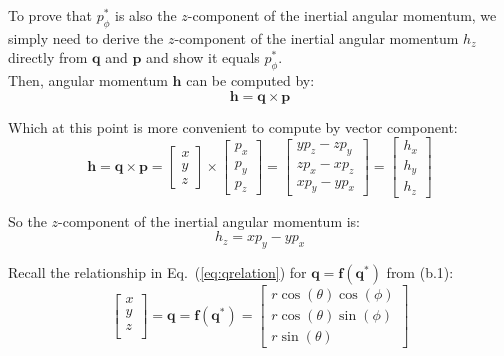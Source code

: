 \documentclass[titlepage]{article}
\begin{document}
To prove that $p_\phi^*$ is also the $z$-component of the inertial angular momentum, we simply need to derive the $z$-component of the inertial angular momentum $h_z$ directly from $\boldsymbol{q}$ and $\boldsymbol{p}$ and show it equals $p_\phi^*$.\\

Then, angular momentum $\boldsymbol{h}$ can be computed by:
\begin{equation}
	\boldsymbol{h}=\boldsymbol{q}\times\boldsymbol{p}
\end{equation}

Which at this point is more convenient to compute by vector component:
\begin{equation}
	\boldsymbol{h}=\boldsymbol{q}\times\boldsymbol{p}=
	\begin{bmatrix}
		x \\
		y \\
		z
	\end{bmatrix}\times
	\begin{bmatrix}
		p_x \\
		p_y \\
		p_z
	\end{bmatrix}=
	\begin{bmatrix}
		yp_z-zp_y \\
		zp_x-xp_z \\
		xp_y-yp_x
	\end{bmatrix}=
	\begin{bmatrix}
		h_x \\
		h_y \\
		h_z
	\end{bmatrix}
\end{equation}

So the $z$-component of the inertial angular momentum is:
\begin{equation}
	h_z=xp_y-yp_x
\end{equation}

Recall the relationship in Eq.~(\ref{eq:qrelation}) for $\boldsymbol{q}=\boldsymbol{f}(\boldsymbol{q}^*)$ from (b.1):
\begin{equation}
	\begin{bmatrix}
		x \\
		y \\
		z \\
	\end{bmatrix}=
	\boldsymbol{q}=\boldsymbol{f}(\boldsymbol{q}^*)=
	\begin{bmatrix}
		r\cos(\theta)\cos(\phi) \\
		r\cos(\theta)\sin(\phi) \\
		r\sin(\theta)
	\end{bmatrix}
\end{equation}
\end{document}
